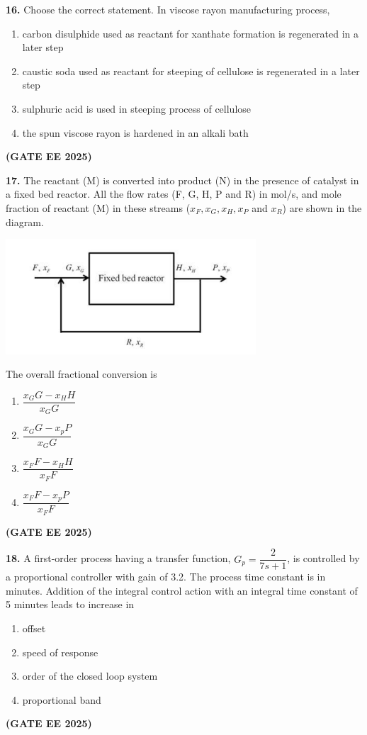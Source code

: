 \documentclass[journal,12pt,onecolumn]{IEEEtran}
\newcommand{\brak}[1]{(#1)}
\begin{document}
\noindent\textbf{16.} Choose the correct statement. In viscose rayon manufacturing process,
\begin{enumerate}
    \item carbon disulphide used as reactant for xanthate formation is regenerated in a later step
    \item caustic soda used as reactant for steeping of cellulose is regenerated in a later step
    \item sulphuric acid is used in steeping process of cellulose
    \item the spun viscose rayon is hardened in an alkali bath
\end{enumerate}
\hfill \textbf{\brak{GATE EE 2025}}

\noindent\textbf{17.} The reactant \brak{M} is converted into product \brak{N} in the presence of catalyst in a fixed bed reactor. All the flow rates \brak{F, G, H, P and R} in mol/s, and mole fraction of reactant \brak{M} in these streams \brak{$x_F, x_G, x_H, x_P$ and $x_R$} are shown in the diagram.
\begin{center}
\includegraphics[width=0.7\textwidth]{figs/17.png}
\end{center}
The overall fractional conversion is
\begin{enumerate}
    \item $\dfrac{x_{G}G-x_{H}H}{x_{G}G}$
    \item $\dfrac{x_{G}G-x_{p}P}{x_{G}G}$
    \item $\dfrac{x_{F}F-x_{H}H}{x_{F}F}$
    \item $\dfrac{x_{F}F-x_{p}P}{x_{F}F}$
\end{enumerate}
\hfill \textbf{\brak{GATE EE 2025}}

\noindent\textbf{18.} A first-order process having a transfer function, $G_{p}=\dfrac{2}{7s+1}$, is controlled by a proportional controller with gain of 3.2. The process time constant is in minutes. Addition of the integral control action with an integral time constant of 5 minutes leads to increase in
\begin{enumerate}
    \item offset
    \item speed of response
    \item order of the closed loop system
    \item proportional band
\end{enumerate}
\hfill \textbf{\brak{GATE EE 2025}}
\end{document}
